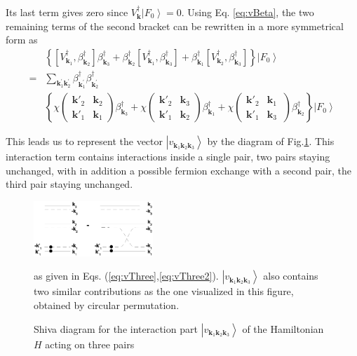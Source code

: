 \documentclass[aps,prb,superscriptaddress,twocolumn]{revtex4}
\newcommand{\vk}{\ensuremath{\mathbf{k}}}
\begin{document}
Its last term gives zero since $V^{\dagger}_\vk\left|F_0\right>  =0$. Using
Eq. \eqref{eq:vBeta}, the two remaining terms of the second bracket can be
rewritten in a more symmetrical form as 
\begin{equation}  \label{eq:vThree2}
\begin{split}
&\left\{\left[V^{\dagger}_{\mathbf{k} _1},\beta^{\dagger}_{\mathbf{k} _2}%
\right]  \beta^{\dagger}_{\mathbf{k} _3}+\beta^{\dagger}_{\mathbf{k} _2}%
\left[V^{\dagger}_{\mathbf{k} _1},\beta^{\dagger}_{\mathbf{k} _3}\right] 
+\beta^{\dagger}_{\mathbf{k} _1}\left[V^{\dagger}_{\mathbf{k}
_2},\beta^{\dagger}_{\mathbf{k} _3}\right]  \right\} \left|F_0\right>   \\
=&\sum_{\vk^{\prime}_1\mathbf{k} ^{\prime}_2}\beta^{\dagger}_{\mathbf{k}
^{\prime}_1}\beta^{\dagger}_{\mathbf{k} ^{\prime}_2} \\
&\left\{\chi\left(\begin{smallmatrix}\vk'_2&\vk_2\\\vk'_1&\vk_1%
\end{smallmatrix}\right)  \beta^{\dagger}_{\mathbf{k} _3}+\chi\left(%
\begin{smallmatrix}\vk'_2&\vk_3\\\vk'_1&\vk_2\end{smallmatrix}\right) 
\beta^{\dagger}_{\mathbf{k} _1}+\chi\left(\begin{smallmatrix}\vk'_2&\vk_1\
\\\vk'_1&\vk_3\end{smallmatrix}\right)  \beta^{\dagger}_{\mathbf{k}
_2}\right\} \left|F_0\right>  
\end{split}%
\end{equation}

This leads us to represent the vector $\left|v_{\mathbf{k} _1\mathbf{k} _2%
\mathbf{k} _3}\right> $ by the diagram of Fig.\ref{fig:threeP}. This
interaction term contains interactions inside a single pair, two pairs
staying unchanged, with in addition a possible fermion exchange with a
second pair, the third pair staying unchanged. 
\begin{figure}[htb]
\caption{Shiva diagram for the interaction part $\left|v_{\mathbf{k} _1\mathbf{k} _2%
\mathbf{k} _3}\right> $ of the Hamiltonian $H$ acting on three pairs }
\label{fig:threeP}
   \includegraphics[width=0.4\textwidth]{threePair.eps}

 as given in Eqs. (\ref{eq:vThree},\ref{eq:vThree2}). $\left|v_{\mathbf{k} _1\mathbf{k} _2%
\mathbf{k} _3}\right> $ also contains two similar contributions as the one
visualized in this figure, obtained by circular permutation.
\end{figure}
\end{document}
